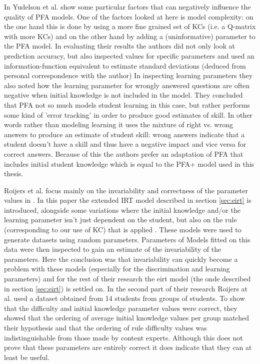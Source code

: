 \documentclass{scrartcl}
\begin{document}
In \cite{blackart} Yudelson et al. show some particular factors that can negatively influence the quality of PFA models. One of the factors looked at here is model complexity: on the one hand this is done by using a more fine grained set of KCs (i.e. a Q-matrix with more KCs) and on the other hand by adding a (uninformative) parameter to the PFA model. In evaluating their results the authors did not only look at prediction accuracy, but also inspected values for specific parameters and used an information-function equivalent to estimate standard deviations (deduced from personal correspondence with the author) In inspecting learning parameters they also noted how the learning parameter for wrongly answered questions are often negative when initial knowledge is not included in the model. They concluded that PFA not so much models student learning in this case, but rather performs some kind of 'error tracking' in order to produce good estimates of skill. In other words rather than modeling learning it uses the mixture of right vs. wrong answers to produce an estimate of student skill: wrong answers indicate that a student doesn't have a skill and thus have a negative impact and vice versa for correct answers. Because of this the authors prefer an adaptation of PFA that includes initial student knowledge which is equal to the PFA+ model used in this thesis.


Roijers et al. focus mainly on the invariability and correctness of the parameter values in \cite{eirt}. In this paper the extended IRT model described in section \ref{sec:eirt} is introduced, alongside some variations where the initial knowledge and/or the learning parameter isn't just dependent on the student, but also on the rule (corresponding to our use of KC) that is applied . These models were used to generate datasets using random parameters. Parameters of Models fitted on this data were then inspected to gain an estimate of the invariability of the parameters. Here the conclusion was that invariability can quickly become a problem with these models (especially for the discrimination and learning parameters) and for the rest of their research the eirt model (the onde described in section \ref{sec:eirt}) is settled on.
In the second part of their research Roijers at al. used a dataset obtained from 14 students from groups of students. To show that the difficulty and initial knowledge parameter values were correct, they showed that the ordering of average initial knowledge values per group matched their hypothesis and that the ordering of rule difficulty values was indistinguishable from those made by content experts. Although this does not prove that these parameters are entirely correct it does indicate that they can at least be useful.
\end{document}
